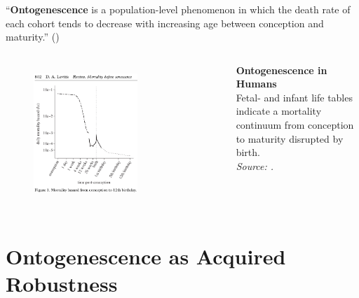 \documentclass{beamer}
\begin{document}
\begin{frame}
\frametitle{\insertsection}

\enquote{\textbf{Ontogenescence} is a population-level phenomenon in which the death rate of each cohort tends to decrease with increasing age between conception and maturity.} (\cite{Levitis2011})

\begin{columns}[c]

\begin{figure}[htb!]
\includegraphics[width = 0.65\textwidth]{./fig/levitis-2011-figure_1.png}\\
\end{figure}

\footnotesize\textbf{Ontogenescence in Humans}\\
Fetal- and infant life tables indicate a mortality continuum from conception to maturity disrupted by birth.\\
\scriptsize\emph{Source: \textcite{Levitis2011}.}

\end{columns}

\end{frame}

\section{Ontogenescence as Acquired Robustness} %
\end{document}
